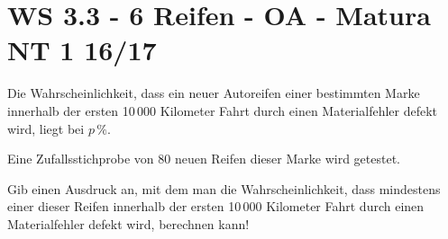 \section{WS 3.3 - 6 Reifen - OA - Matura NT 1 16/17}

\begin{beispiel}[WS 3.3]{1} %
Die Wahrscheinlichkeit, dass ein neuer Autoreifen einer bestimmten Marke innerhalb der ersten 10\,000 Kilometer Fahrt durch einen Materialfehler defekt wird, liegt bei $p\,\%$.

Eine Zufallsstichprobe von 80 neuen Reifen dieser Marke wird getestet.

Gib einen Ausdruck an, mit dem man die Wahrscheinlichkeit, dass mindestens einer dieser Reifen innerhalb der ersten 10\,000 Kilometer Fahrt durch einen Materialfehler defekt wird, berechnen kann!

\end{beispiel}